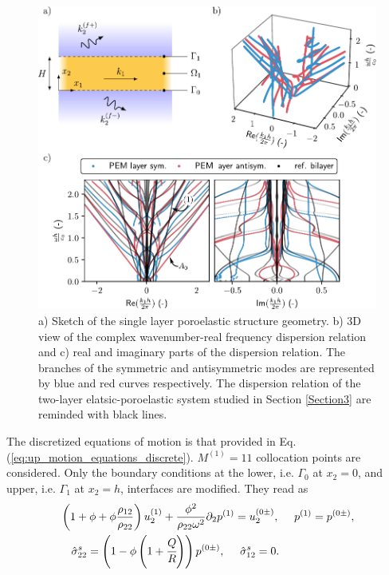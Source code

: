 \begin{figure}
    \centering
    \includegraphics{chapitres/article_JAP/poroelastic_appendix.pdf}
    \caption{a) Sketch of the single layer poroelastic structure geometry. b) 3D view of the complex wavenumber-real frequency dispersion relation and c) real and imaginary parts of the dispersion relation. The branches of the symmetric and antisymmetric modes are represented by blue and red curves respectively. The dispersion relation of the two-layer elatsic-poroelastic system studied in Section \ref{Section3} are reminded with black lines.}
    \label{fig:fluid_coupled_poroelastic}
\end{figure}
The discretized equations of motion is that provided in Eq.(\ref{eq:up_motion_equations_discrete}). $M^{(1)}=11$ collocation points are considered. Only the boundary conditions at the lower, i.e. $\Gamma_0$ at $x_2 = 0$, and upper, i.e. $\Gamma_1$ at $x_2 = h$, interfaces are modified. They read as \cite{debergue1999}
    \begin{equation}
        \begin{split}
            & \left(1 + \phi + \phi\frac{ \rho_{12}}{ \rho_{22}}\right)u_2^{(1)} + \frac{\phi^2}{ \rho_{22} \omega^2} \partial_2 p^{(1)} = u_2^{(0\pm)},~ 
            \quad p^{(1)}  = p^{(0\pm)},\\
            &\quad \hat \sigma_{22}^s = \left( 1 - \phi \left(1+ \cfrac{ Q} { R}\right)\right) p^{(0\pm)},~
            \quad \hat \sigma_{12}^s = 0.
        \end{split}
    \end{equation}
    
